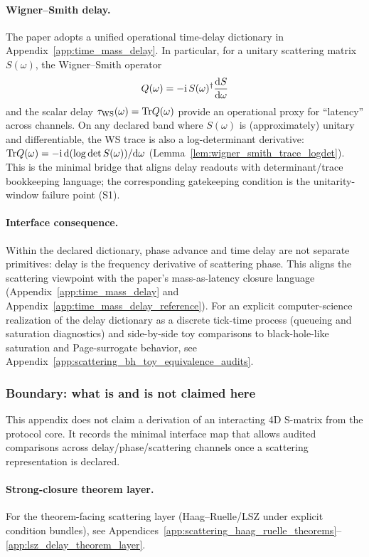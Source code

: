 \paragraph{Wigner--Smith delay.}
\InterfaceTag The paper adopts a unified operational time-delay dictionary in Appendix~\ref{app:time_mass_delay}.
In particular, for a unitary scattering matrix $S(\omega)$, the Wigner--Smith operator
\[
Q(\omega)=-\mathrm{i}\,S(\omega)^\dagger \frac{\mathrm{d} S}{\mathrm{d} \omega}
\]
and the scalar delay $\tau_{\mathrm{WS}}(\omega)=\mathrm{Tr} Q(\omega)$ provide an operational proxy for ``latency'' across channels.
\AuditTag On any declared band where $S(\omega)$ is (approximately) unitary and differentiable, the WS trace is also a log-determinant derivative:
$\mathrm{Tr} Q(\omega)=-\mathrm{i}\,\mathrm{d}(\log\det S(\omega))/\mathrm{d}\omega$ (Lemma~\ref{lem:wigner_smith_trace_logdet}).
This is the minimal bridge that aligns delay readouts with determinant/trace bookkeeping language; the corresponding gatekeeping condition is the unitarity-window failure point (S1).

\paragraph{Interface consequence.}
\InterfaceTag Within the declared dictionary, phase advance and time delay are not separate primitives: delay is the frequency derivative of scattering phase.
This aligns the scattering viewpoint with the paper's mass-as-latency closure language (Appendix~\ref{app:time_mass_delay} and Appendix~\ref{app:time_mass_delay_reference}).
\AuditTag For an explicit computer-science realization of the delay dictionary as a discrete tick-time process (queueing and saturation diagnostics) and side-by-side toy comparisons to black-hole-like saturation and Page-surrogate behavior, see Appendix~\ref{app:scattering_bh_toy_equivalence_audits}.

\subsubsection{Boundary: what is and is not claimed here}
\AuditTag This appendix does not claim a derivation of an interacting 4D S-matrix from the protocol core.
It records the minimal interface map that allows audited comparisons across delay/phase/scattering channels once a scattering representation is declared.

\paragraph{Strong-closure theorem layer.}
\AuditTag For the theorem-facing scattering layer (Haag--Ruelle/LSZ under explicit condition bundles), see Appendices~\ref{app:scattering_haag_ruelle_theorems}--\ref{app:lsz_delay_theorem_layer}.

